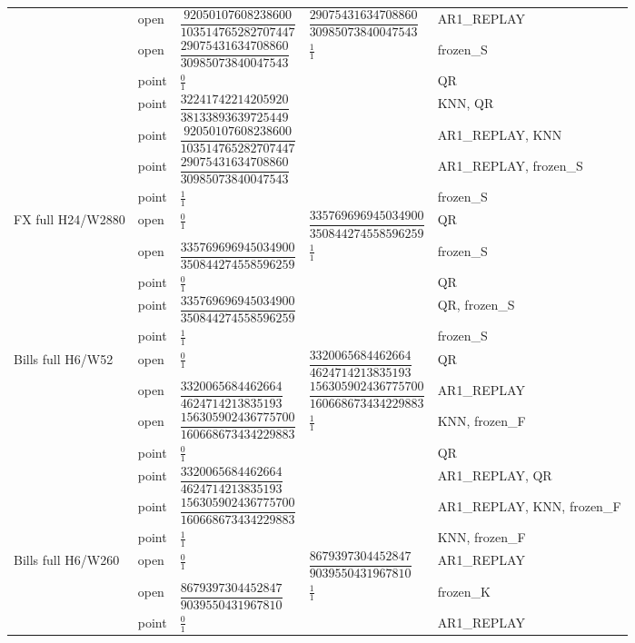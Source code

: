\documentclass[11pt,a4paper]{article}
\begin{document}
\begin{longtable}{p{28mm}p{10mm}p{39mm}p{39mm}p{28mm}}
 & open & \(\dfrac{92050107608238600}{103514765282707447}\) & \(\dfrac{29075431634708860}{30985073840047543}\) & AR1\_REPLAY \\
 & open & \(\dfrac{29075431634708860}{30985073840047543}\) & \(\frac{1}{1}\) & frozen\_S \\
 & point & \(\frac{0}{1}\) &  & QR \\
 & point & \(\dfrac{32241742214205920}{38133893639725449}\) &  & KNN, QR \\
 & point & \(\dfrac{92050107608238600}{103514765282707447}\) &  & AR1\_REPLAY, KNN \\
 & point & \(\dfrac{29075431634708860}{30985073840047543}\) &  & AR1\_REPLAY, frozen\_S \\
 & point & \(\frac{1}{1}\) &  & frozen\_S \\
FX full H24/W2880 & open & \(\frac{0}{1}\) & \(\dfrac{335769696945034900}{350844274558596259}\) & QR \\
 & open & \(\dfrac{335769696945034900}{350844274558596259}\) & \(\frac{1}{1}\) & frozen\_S \\
 & point & \(\frac{0}{1}\) &  & QR \\
 & point & \(\dfrac{335769696945034900}{350844274558596259}\) &  & QR, frozen\_S \\
 & point & \(\frac{1}{1}\) &  & frozen\_S \\
Bills full H6/W52 & open & \(\frac{0}{1}\) & \(\dfrac{3320065684462664}{4624714213835193}\) & QR \\
 & open & \(\dfrac{3320065684462664}{4624714213835193}\) & \(\dfrac{156305902436775700}{160668673434229883}\) & AR1\_REPLAY \\
 & open & \(\dfrac{156305902436775700}{160668673434229883}\) & \(\frac{1}{1}\) & KNN, frozen\_F \\
 & point & \(\frac{0}{1}\) &  & QR \\
 & point & \(\dfrac{3320065684462664}{4624714213835193}\) &  & AR1\_REPLAY, QR \\
 & point & \(\dfrac{156305902436775700}{160668673434229883}\) &  & AR1\_REPLAY, KNN, frozen\_F \\
 & point & \(\frac{1}{1}\) &  & KNN, frozen\_F \\
Bills full H6/W260 & open & \(\frac{0}{1}\) & \(\dfrac{8679397304452847}{9039550431967810}\) & AR1\_REPLAY \\
 & open & \(\dfrac{8679397304452847}{9039550431967810}\) & \(\frac{1}{1}\) & frozen\_K \\
 & point & \(\frac{0}{1}\) &  & AR1\_REPLAY \\

\end{longtable}
\end{document}
